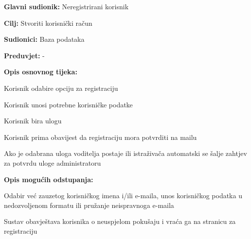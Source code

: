 					\noindent {}
					\begin{packed_item}
	
						\item \textbf{Glavni sudionik: }Neregistrirani korisnik
						\item  \textbf{Cilj:} Stvoriti korisnički račun 
						\item  \textbf{Sudionici:} Baza podataka
						\item  \textbf{Preduvjet:} -
						\item  \textbf{Opis osnovnog tijeka:} 
						
						
						\item[] \begin{packed_enum}
	
							\item Korisnik odabire opciju za registraciju							
							\item Korisnik unosi potrebne korisničke podatke
							\item Korisnik bira ulogu
							\item Korisnik prima obavijest da registraciju mora potvrditi na mailu
							\item Ako je odabrana uloga voditelja postaje ili istraživača automatski se šalje zahtjev za potvrdu uloge administratoru
							
						\end{packed_enum}
						
						\item  \textbf{Opis mogućih odstupanja:}
						
						\item[] \begin{packed_item}
	
							\item[2.a] Odabir već zauzetog korisničkog imena i/ili e-maila, unos korisničkog
							podatka u nedozvoljenom formatu ili pružanje neispravnoga e-maila
							
							\item[] \begin{packed_enum}
								
								\item Sustav obavještava korisnika o neuspjelom pokušaju i vraća ga na stranicu za registraciju 
								
							\end{packed_enum}
							
						\end{packed_item}
					\end{packed_item}

